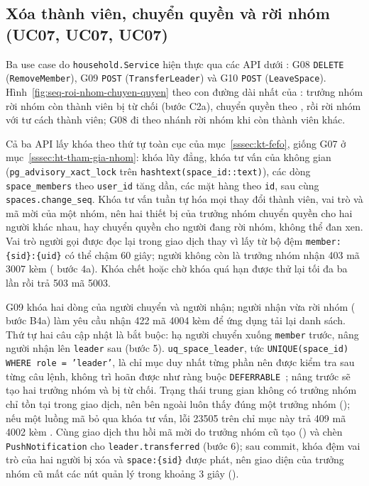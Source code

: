 \subsection{Xóa thành viên, chuyển quyền và rời nhóm (UC07, UC07, UC07)}\label{sssec:ht-roi-nhom}

Ba use case do \texttt{household.Service} hiện thực qua các API dưới : G08 \texttt{DELETE}  (\texttt{RemoveMember}), G09 \texttt{POST}  (\texttt{TransferLeader}) và G10 \texttt{POST}  (\texttt{LeaveSpace}). Hình~\ref{fig:seq-roi-nhom-chuyen-quyen} theo con đường dài nhất của : trưởng nhóm rời nhóm còn thành viên bị từ chối (bước C2a), chuyển quyền theo , rồi rời nhóm với tư cách thành viên; G08 đi theo nhánh rời nhóm khi còn thành viên khác.


Cả ba API lấy khóa theo thứ tự toàn cục của mục~\ref{sssec:kt-fefo}, giống G07 ở mục~\ref{sssec:ht-tham-gia-nhom}: khóa lũy đẳng, khóa tư vấn của không gian (\texttt{pg\_advisory\_xact\_lock} trên \texttt{hashtext(space\_id::text)}), các dòng \texttt{space\_members} theo \texttt{user\_id} tăng dần, các mặt hàng theo \texttt{id}, sau cùng \texttt{spaces.change\_seq}. Khóa tư vấn tuần tự hóa mọi thay đổi thành viên, vai trò và mã mời của một nhóm, nên hai thiết bị của trưởng nhóm chuyển quyền cho hai người khác nhau, hay chuyển quyền cho người đang rời nhóm, không thể đan xen. Vai trò người gọi được đọc lại trong giao dịch thay vì lấy từ bộ đệm \texttt{member:\{sid\}:\{uid\}} có thể chậm 60 giây; người không còn là trưởng nhóm nhận 403 mã 3007 kèm  ( bước 4a). Khóa chết hoặc chờ khóa quá hạn được thử lại tối đa ba lần rồi trả 503 mã 5003.

G09 khóa hai dòng của người chuyển và người nhận; người nhận vừa rời nhóm ( bước B4a) làm yêu cầu nhận 422 mã 4004 kèm  để ứng dụng tải lại danh sách. Thứ tự hai câu cập nhật là bắt buộc: hạ người chuyển xuống \texttt{member} trước, nâng người nhận lên \texttt{leader} sau (bước 5). \texttt{uq\_space\_leader}, tức \texttt{UNIQUE(space\_id) WHERE role = 'leader'}, là chỉ mục duy nhất từng phần nên được kiểm tra sau từng câu lệnh, không trì hoãn được như ràng buộc \texttt{DEFERRABLE}~\cite{postgresql}; nâng trước sẽ tạo hai trưởng nhóm và bị từ chối. Trạng thái trung gian không có trưởng nhóm chỉ tồn tại trong giao dịch, nên bên ngoài luôn thấy đúng một trưởng nhóm (); nếu một luồng mã bỏ qua khóa tư vấn, lỗi 23505 trên chỉ mục này trả 409 mã 4002 kèm . Cùng giao dịch thu hồi mã mời do trưởng nhóm cũ tạo () và chèn \texttt{PushNotification} cho \texttt{leader.transferred} (bước 6); sau commit, khóa đệm vai trò của hai người bị xóa và \texttt{space:\{sid\}} được phát, nên giao diện của trưởng nhóm cũ mất các nút quản lý trong khoảng 3 giây ().

